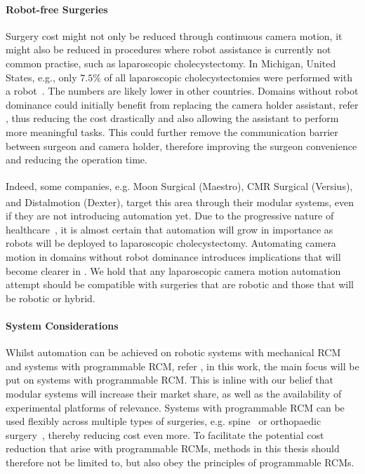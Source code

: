 \paragraph{Robot-free Surgeries} Surgery cost might not only be reduced through continuous camera motion, it might also be reduced in procedures where robot assistance is currently not common practise, such as laparoscopic cholecystectomy. In Michigan, United States, e.g., only $7.5\%$ of all laparoscopic cholecystectomies were performed with a robot~\cite{sheetz2020trends}. The numbers are likely lower in other countries. Domains without robot dominance could initially benefit from replacing the camera holder assistant, refer , thus reducing the cost drastically and also allowing the assistant to perform more meaningful tasks. This could further remove the communication barrier between surgeon and camera holder, therefore improving the surgeon convenience and reducing the operation time. 

Indeed, some companies, e.g. Moon Surgical (Maestro\textsuperscript{\textregistered}), CMR Surgical (Versius\textsuperscript{\textregistered}), and Distalmotion (Dexter\textsuperscript{\textregistered}), target this area through their modular systems, even if they are not introducing automation yet. Due to the progressive nature of healthcare~\cite{chatterjee2024advancements}, it is almost certain that automation will grow in importance as robots will be deployed to laparoscopic cholecystectomy. Automating camera motion in domains without robot dominance introduces implications that will become clearer in . We hold that any laparoscopic camera motion automation attempt should be compatible with surgeries that are robotic and those that will be robotic or hybrid.






\paragraph{System Considerations} Whilst automation can be achieved on robotic systems with mechanical RCM and systems with programmable RCM, refer , in this work, the main focus will be put on systems with programmable RCM. This is inline with our belief that modular systems will increase their market share, as well as the availability of experimental platforms of relevance. Systems with programmable RCM can be used flexibly across multiple types of surgeries, e.g. spine~\cite{farber2021robotics} or orthopaedic surgery~\cite{suarez2023revolutionizing}, thereby reducing cost even more. To facilitate the potential cost reduction that arise with programmable RCMs, methods in this thesis should therefore not be limited to, but also obey the principles of programmable RCMs. 


